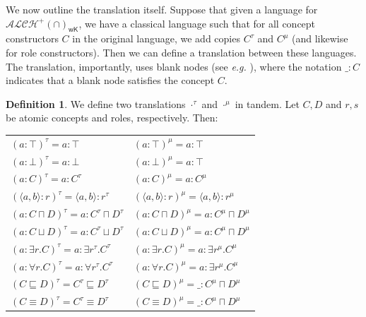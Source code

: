 \documentclass[letterpaper]{article} %
\theoremstyle{definition}
\theoremstyle{definition}
\newtheorem{definition}{Definition}
\theoremstyle{definition}
\theoremstyle{definition}
\theoremstyle{definition}
\begin{document}
\noindent We now outline the translation itself. Suppose that given a language for $\mathcal{ALCH}^+(\cap)_{\mathsf{wK}}$, we have a classical language such that for all concept constructors $C$ in the original language, we add copies $C^{\tau}$ and $C^{\mu}$ (and likewise for role constructors).  Then we can define a translation between these languages. The translation, importantly, uses blank nodes (see \emph{e.g.} \cite{HOGAN201442}), where the notation $\_:C$ indicates that a blank node satisfies the concept $C$.

\begin{definition}
    We define two translations $\cdot^{\tau}$ and $\cdot^{\mu}$ in tandem. Let $C,D$ and $r,s$ be atomic concepts and roles, respectively. Then:

\vspace{-.2cm}
\begin{center}

    {\small
   
    \begin{tabular}{ll}
    $(a:\top)^{\tau}=a:\top$ & $(a:\top)^{\mu}=a:\top$\\
    $(a:\bot)^{\tau}=a:\bot$ & $(a:\bot)^{\mu}=a:\top$\\
    $(a:C)^{\tau}=a:C^{\tau}$ & $(a:C)^{\mu}=a:C^{\mu}$\\
    $(\langle a,b\rangle:r)^{\tau}=\langle a,b\rangle:r^{\tau}$ & $(\langle a,b\rangle:r)^{\mu}=\langle a,b\rangle:r^{\mu}$\\
$(a:C\sqcap D)^{\tau}=a:C^{\tau}\sqcap D^{\tau}$ & $(a:C\sqcap D)^{\mu}=a:C^{\mu}\sqcap D^{\mu}$\\

$(a:C\sqcup D)^{\tau}=a:C^{\tau}\sqcup D^{\tau}$ & $(a:C\sqcup D)^{\mu}=a:C^{\mu}\sqcap D^{\mu}$\\

$(a:\exists r.C)^{\tau}=a:\exists r^{\tau}.C^{\tau}$ & $(a:\exists r.C)^{\mu}=a:\exists r^{\mu}.C^{\mu}$\\

$(a:\forall r.C)^{\tau}=a:\forall r^{\tau}.C^{\tau}$ & $(a:\forall r.C)^{\mu}=a:\exists r^{\mu}.C^{\mu}$\\

$(C\sqsubseteq D)^{\tau}=C^{\tau}\sqsubseteq D^{\tau}$ & $(C\sqsubseteq D)^{\mu}=\_:C^{\mu}\sqcap D^{\mu}$\\

$(C\equiv D)^{\tau}=C^{\tau}\equiv D^{\tau}$ & $(C\equiv D)^{\mu}=\_:C^{\mu}\sqcap D^{\mu}$\\


\end{tabular}}
\end{center}
\end{definition}
\end{document}
